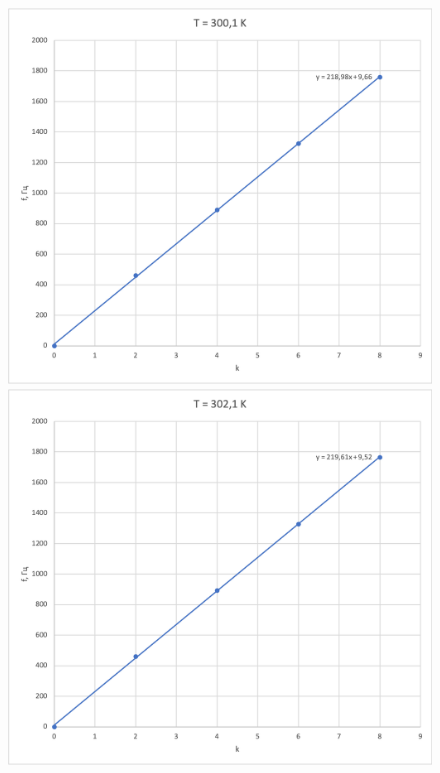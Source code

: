 \documentclass[a4paper, 12pt]{article}
\begin{document}
\begin{enumerate}
\begin{figure}[ph]
\begin{minipage}[h]{0.5\linewidth}
            \end{minipage}
            \vfill
            \begin{minipage}[h]{0.5\linewidth}
                \includegraphics[width=1\linewidth]{3.png}
            \end{minipage}
            \hfill
            \begin{minipage}[h]{0.5\linewidth}
                \includegraphics[width=1\linewidth]{4.png}

\end{minipage}
\end{figure}
\end{enumerate}
\end{document}
